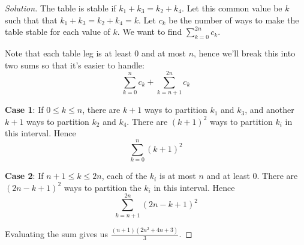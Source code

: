 \begin{proof}[Solution]
The table is stable if $k_1+k_3=k_2+k_4$. Let this common value be $k$ such that that $k_1+k_3=k_2+k_4=k$. Let $c_k$ be the number of ways to make the table stable for each value of $k$. We want to find $\sum_{k=0}^{2n}c_k$.

Note that each table leg is at least 0 and at most $n$, hence we'll break this into two sums so that it's easier to handle:
\[\sum_{k=0}^n c_k+\sum_{k=n+1}^{2n}c_k\]

\textbf{Case 1}: If $0\le k\le n$, there are $k+1$ ways to partition $k_1$ and $k_3$, and another $k+1$ ways to partition $k_2$ and $k_4$. There are $(k+1)^2$ ways to partition $k_i$ in this interval. Hence 
\[\sum_{k=0}^n (k+1)^2\]

\textbf{Case 2}: If $n+1\le k\le 2n$, each of the $k_i$ is at most $n$ and at least $0$. There are $(2n-k+1)^2$ ways to partition the $k_i$ in this interval. Hence
\[\sum_{k=n+1}^{2n}(2n-k+1)^2\]

Evaluating the sum gives us $\boxed{\frac{(n+1)(2n^2+4n+3)}{3}}$.
\end{proof}
